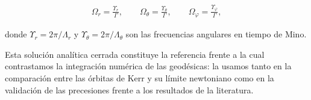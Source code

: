 \begin{align}
    \Omega_r = \frac{\Upsilon_r}{\Gamma}, \qquad \Omega_\theta = \frac{\Upsilon_\theta}{\Gamma}, \qquad \Omega_\varphi = \frac{\Upsilon_\varphi}{\Gamma}, \label{eq:frecuencias_fisicas}
\end{align}

donde $\Upsilon_r = 2\pi/\Lambda_r$ y $\Upsilon_\theta = 2\pi/\Lambda_\theta$ son las frecuencias angulares en tiempo de Mino.

Esta solución analítica cerrada constituye la referencia frente a la cual contrastamos la integración numérica de las geodésicas: la usamos tanto en la comparación entre las órbitas de Kerr y su límite newtoniano como en la validación de las precesiones frente a los resultados de la literatura.
